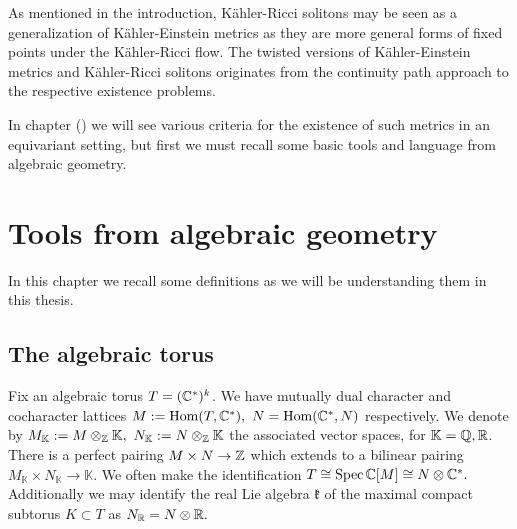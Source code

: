 As mentioned in the introduction, K\"ahler-Ricci solitons may be seen as a generalization of K\"ahler-Einstein metrics as they are more general forms of fixed points under the K\"ahler-Ricci flow. The twisted versions of K\"ahler-Einstein metrics and K\"ahler-Ricci solitons originates from the continuity path approach to the respective existence problems.

In chapter () we will see various criteria for the existence of such metrics in an equivariant setting, but first we must recall some basic tools and language from algebraic geometry.
\section{Tools from algebraic geometry} \label{basics}
In this chapter we recall some definitions as we will be understanding them in this thesis.
\subsection{The algebraic torus}
Fix an algebraic torus \(T = (\mathbb{C}^*)^k\). We have mutually dual character and cocharacter lattices \(M := \operatorname{Hom}(T,\mathbb{C}^*), \ N = \operatorname{Hom}(\mathbb{C}^*,N)\) respectively. We denote by \(M_\mathbb{K} := M \otimes_\ZZ \mathbb{K}, \ N_\mathbb{K} := N \otimes_\ZZ \mathbb{K} \) the associated vector spaces, for \(\mathbb{K} = \mathbb{Q}, \mathbb{R}\). There is a perfect pairing \(M \times N \to \mathbb{Z}\) which extends to a bilinear pairing \(M_\mathbb{K} \times N_\mathbb{K} \to \mathbb{K}\). We often make the identification \( T \cong \operatorname{Spec} \mathbb{C}[M] \cong N \otimes \mathbb{C}^*. \) Additionally we may identify the real Lie algebra \(\mathfrak{k}\) of the maximal compact subtorus \(K \subset T\) as \( N_{\mathbb{R}} = N \otimes \mathbb{R}.\)

